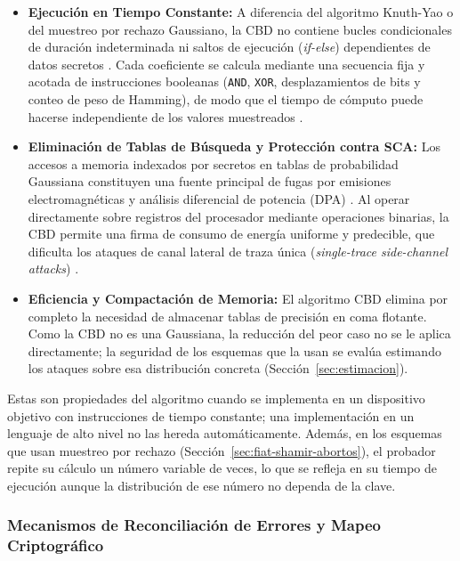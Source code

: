 \begin{itemize}
    \item \textbf{Ejecución en Tiempo Constante:} A diferencia del algoritmo Knuth-Yao o del muestreo por rechazo Gaussiano, la CBD no contiene bucles condicionales de duración indeterminada ni saltos de ejecución (\textit{if-else}) dependientes de datos secretos \cite{yang2025multiserver, mukil2026implementing}. Cada coeficiente se calcula mediante una secuencia fija y acotada de instrucciones booleanas (\texttt{AND}, \texttt{XOR}, desplazamientos de bits y conteo de peso de Hamming), de modo que el tiempo de cómputo puede hacerse independiente de los valores muestreados \cite{yang2025multiserver}.

    \item \textbf{Eliminación de Tablas de Búsqueda y Protección contra SCA:} Los accesos a memoria indexados por secretos en tablas de probabilidad Gaussiana constituyen una fuente principal de fugas por emisiones electromagnéticas y análisis diferencial de potencia (DPA) \cite{mukil2026implementing}. Al operar directamente sobre registros del procesador mediante operaciones binarias, la CBD permite una firma de consumo de energía uniforme y predecible, que dificulta los ataques de canal lateral de traza única (\textit{single-trace side-channel attacks}) \cite{mukil2026implementing}.

    \item \textbf{Eficiencia y Compactación de Memoria:} El algoritmo CBD elimina por completo la necesidad de almacenar tablas de precisión en coma flotante. Como la CBD no es una Gaussiana, la reducción del peor caso no se le aplica directamente; la seguridad de los esquemas que la usan se evalúa estimando los ataques sobre esa distribución concreta (Sección~\ref{sec:estimacion}).
\end{itemize}

Estas son propiedades del algoritmo cuando se implementa en un dispositivo objetivo con instrucciones de tiempo constante; una implementación en un lenguaje de alto nivel no las hereda automáticamente. Además, en los esquemas que usan muestreo por rechazo (Sección~\ref{sec:fiat-shamir-abortos}), el probador repite su cálculo un número variable de veces, lo que se refleja en su tiempo de ejecución aunque la distribución de ese número no dependa de la clave.

\subsubsection{Mecanismos de Reconciliación de Errores y Mapeo Criptográfico}

